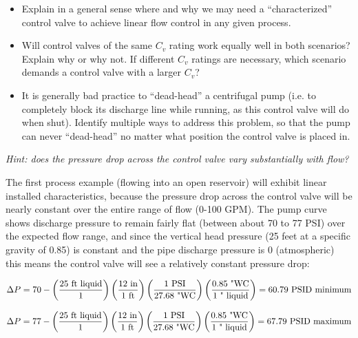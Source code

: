 \begin{itemize}
\item{} Explain in a general sense where and why we may need a ``characterized'' control valve to achieve linear flow control in any given process.
\item{} Will control valves of the same $C_v$ rating work equally well in both scenarios?  Explain why or why not.  If different $C_v$ ratings are necessary, which scenario demands a control valve with a larger $C_v$?
\item{} It is generally bad practice to ``dead-head'' a centrifugal pump (i.e. to completely block its discharge line while running, as this control valve will do when shut).  Identify multiple ways to address this problem, so that the pump can never ``dead-head'' no matter what position the control valve is placed in.
\end{itemize}







{\it Hint: does the pressure drop across the control valve vary substantially with flow?}
 






The first process example (flowing into an open reservoir) will exhibit linear installed characteristics, because the pressure drop across the control valve will be nearly constant over the entire range of flow (0-100 GPM).  The pump curve shows discharge pressure to remain fairly flat (between about 70 to 77 PSI) over the expected flow range, and since the vertical head pressure (25 feet at a specific gravity of 0.85) is constant and the pipe discharge pressure is 0 (atmospheric) this means the control valve will see a relatively constant pressure drop:

$$\Delta P = 70 - \left(25 \hbox{ ft liquid} \over 1 \right)  \left(12 \hbox{ in} \over 1 \hbox{ ft}\right)  \left(1 \hbox{ PSI} \over 27.68 \hbox{ "WC}\right)  \left(0.85 \hbox{ "WC} \over 1 \hbox{ " liquid}\right) = 60.79 \hbox{ PSID minimum}$$

$$\Delta P = 77 - \left(25 \hbox{ ft liquid} \over 1 \right)  \left(12 \hbox{ in} \over 1 \hbox{ ft}\right)  \left(1 \hbox{ PSI} \over 27.68 \hbox{ "WC}\right)  \left(0.85 \hbox{ "WC} \over 1 \hbox{ " liquid}\right) = 67.79 \hbox{ PSID maximum}$$

